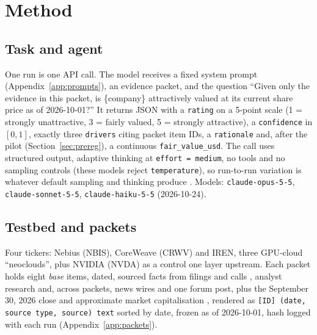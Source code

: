 \documentclass[11pt,a4paper]{article}
\begin{document}
\section{Method}
\label{sec:method}

\subsection{Task and agent}
\label{sec:task}
One run is one API call. The model receives a fixed system prompt (Appendix~\ref{app:prompts}), an evidence packet, and the question ``Given only the evidence in this packet, is \{company\} attractively valued at its current share price as of 2026-10-01?'' It returns JSON with a \texttt{rating} on a 5-point scale (1 = strongly unattractive, 3 = fairly valued, 5 = strongly attractive), a \texttt{confidence} in $[0,1]$, exactly three \texttt{drivers} citing packet item IDs, a \texttt{rationale} and, after the pilot (Section~\ref{sec:prereg}), a continuous \texttt{fair\_value\_usd}. The call uses structured output, adaptive thinking at \texttt{effort = medium}, no tools and no sampling controls (these models reject \texttt{temperature}), so run-to-run variation is whatever default sampling and thinking produce \citep{anthropic2026api}. Models: \texttt{claude-opus-5-5}, \texttt{claude-sonnet-5-5}, \texttt{claude-haiku-5-5} (2026-10-24).

\subsection{Testbed and packets}
\label{sec:packets}
Four tickers: Nebius (NBIS), CoreWeave (CRWV) and IREN, three GPU-cloud ``neoclouds'', plus NVIDIA (NVDA) as a control one layer upstream. Each packet holds eight \emph{base} items, dated, sourced facts from filings and calls \citep{nebius2026q2,coreweave2026q2,iren2026tenk,nvidia2026q2}, analyst research \citep{semianalysis2026} and, across packets, news wires and one forum post, plus the September 30, 2026 close and approximate market capitalisation \citep{yahoo2026}, rendered as \texttt{[ID] (date, source type, source) text} sorted by date, frozen as of 2026-10-01, hash logged with each run (Appendix~\ref{app:packets}).
\end{document}
